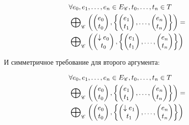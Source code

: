 \begin{itemize}
\begin{equation}
\label{cpa_strengthen_req_1}
\begin{aligned}
& \forall e_0, e_1, \dots, e_n \in E_{\mathscr{C}}, t_0, \dots, t_n \in T \\
& \mathrel{\bigoplus}_{\mathscr{C}}
\left(
\begin{pmatrix}
e_0 \\
t_0 
\end{pmatrix},
\left\{
\begin{pmatrix}
e_1 \\
t_1 
\end{pmatrix},
\dots ,
\begin{pmatrix}
e_n \\
t_n 
\end{pmatrix}
\right\}
\right) = \\
& \mathrel{\bigoplus}_{\mathscr{C}}
\left(
\begin{pmatrix}
\downarrow e_0 \\
t_0 
\end{pmatrix},
\left\{
\begin{pmatrix}
e_1 \\
t_1 
\end{pmatrix},
\dots ,
\begin{pmatrix}
e_n \\
t_n 
\end{pmatrix}
\right\}
\right)
\end{aligned}
\end{equation}

И симметричное требование для второго аргумента:

\begin{equation}
\label{cpa_strengthen_req_2}
\begin{aligned}
& \forall e_0, e_1, \dots, e_n \in E_{\mathscr{C}}, t_0, \dots, t_n \in T \\
& \mathrel{\bigoplus}_{\mathscr{C}}
\left(
\begin{pmatrix}
e_0 \\
t_0 
\end{pmatrix},
\left\{
\begin{pmatrix}
e_1 \\
t_1 
\end{pmatrix},
\dots ,
\begin{pmatrix}
e_n \\
t_n 
\end{pmatrix}
\right\}
\right) = \\
& \mathrel{\bigoplus}_{\mathscr{C}}
\left(
\begin{pmatrix}
e_0 \\
t_0 
\end{pmatrix},
\left\{
\begin{pmatrix}
\downarrow e_1 \\
t_1 
\end{pmatrix},
\dots ,
\begin{pmatrix}
e_n \\
t_n 
\end{pmatrix}
\right\}
\right)
\end{aligned}
\end{equation}


\end{itemize}
